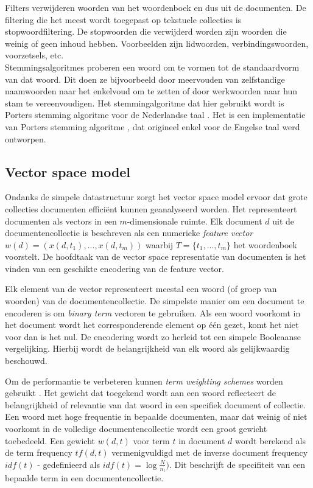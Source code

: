 Filters verwijderen woorden van het woordenboek en dus uit de documenten. De filtering die het meest wordt toegepast op tekstuele collecties is stopwoordfiltering. De stopwoorden die verwijderd worden zijn woorden die weinig of geen inhoud hebben. Voorbeelden zijn lidwoorden, verbindingswoorden, voorzetsels, etc. \\
Stemmingsalgoritmes proberen een woord om te vormen tot de standaardvorm van dat woord. Dit doen ze bijvoorbeeld door meervouden van zelfstandige naamwoorden naar het enkelvoud om te zetten of door werkwoorden naar hun stam te vereenvoudigen. Het stemmingalgoritme dat hier gebruikt wordt is Porters stemming algoritme voor de Nederlandse taal \cite{Kraaij1994}. Het is een implementatie van Porters stemming algoritme \cite{Porter1980}, dat origineel enkel voor de Engelse taal werd ontworpen.

\subsection{Vector space model}\label{vector-space-model}
Ondanks de simpele datastructuur zorgt het vector space model ervoor dat grote collecties documenten effici\"ent kunnen geanalyseerd worden. Het representeert documenten als vectors in een $m$-dimensionale ruimte. Elk document $d$ uit de documentencollectie is beschreven als een numerieke\textit{ feature vector} $w(d) = (x(d,t_1),...,x(d,t_m))$ waarbij $T=\{t_1,...,t_m\}$ het woordenboek voorstelt. De hoofdtaak van de vector space representatie van documenten is het vinden van een geschikte encodering van de feature vector. 

Elk element van de vector representeert meestal een woord (of groep van woorden) van de documentencollectie. De simpelste manier om een document te encoderen is om \textit{binary term} vectoren te gebruiken. Als een woord voorkomt in het document wordt het corresponderende element op \'e\'en gezet, komt het niet voor dan is het nul. De encodering wordt zo herleid tot een simpele Booleaanse vergelijking. Hierbij wordt de belangrijkheid van elk woord als gelijkwaardig beschouwd. 

Om de performantie te verbeteren kunnen \textit{term weighting schemes} worden gebruikt \cite{Salton1988}. Het gewicht dat toegekend wordt aan een woord reflecteert de belangrijkheid of relevantie van dat woord in een specifiek document of collectie. Een woord met hoge frequentie in bepaalde documenten, maar dat weinig of niet voorkomt in de volledige documentencollectie wordt een groot gewicht toebedeeld. Een gewicht $w(d,t)$ voor term $t$ in document $d$ wordt berekend als de term frequency $tf(d,t)$ vermenigvuldigd met de inverse document frequency $idf(t)$ - gedefinieerd als $idf(t)=\log{\frac{N}{n_t}})$. Dit beschrijft de specifiteit van een bepaalde term in een documentencollectie. 

